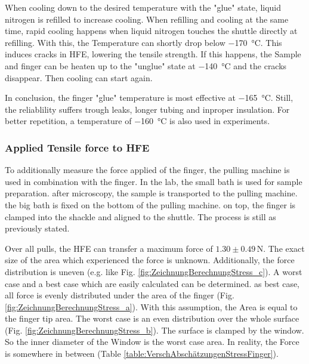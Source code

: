 When cooling down to the desired temperature with the "glue" state, liquid nitrogen is refilled to increase cooling. When refilling and cooling at the same time, rapid cooling happens when liquid nitrogen touches the shuttle directly at refilling. With this, the Temperature can shortly drop below \SI{-170}{\degreeCelsius}. This induces cracks in HFE, lowering the tensile strength. If this happens, the Sample and finger can be heaten up to the "unglue" state at \SI{-140}{\degreeCelsius} and the cracks disappear. Then cooling can start again.

In conclusion, the finger "glue" temperature is most effective at \SI{-165}{\degreeCelsius}. Still, the reliablility suffers trough leaks, longer tubing and inproper insulation. For better repetition, a temperature of \SI{-160}{\degreeCelsius} is also used in experiments.

\subsubsection{Applied Tensile force to HFE}

To additionally measure the force applied of the finger, the pulling machine is used in combination with the finger. In the lab, the small bath is used for sample preparation. after microscopy, the sample is transported to the pulling machine. the big bath is fixed on the bottom of the pulling machine. on top, the finger is clamped into the shackle and aligned to the shuttle. The process is still as previously stated. 

Over all pulls, the HFE can transfer a maximum force of $1.30\pm0.49\,\si{\newton}$. The exact size of the area which experienced the force is unknown. Additionally, the force distribution is uneven (e.g. like Fig. \ref{fig:ZeichnungBerechnungStress_c}). A worst case and a best case which are easily calculated can be determined. as best case, all force is evenly distributed under the area of the finger (Fig. \ref{fig:ZeichnungBerechnungStress_a}). With this assumption, the Area is equal to the finger tip area. The worst case is an even distribution over the whole surface (Fig. \ref{fig:ZeichnungBerechnungStress_b}). The surface is clamped by the window. So the inner diameter of the Window is the worst case area. In reality, the Force is somewhere in between (Table \ref{table:VerschAbschätzungenStressFinger}).

